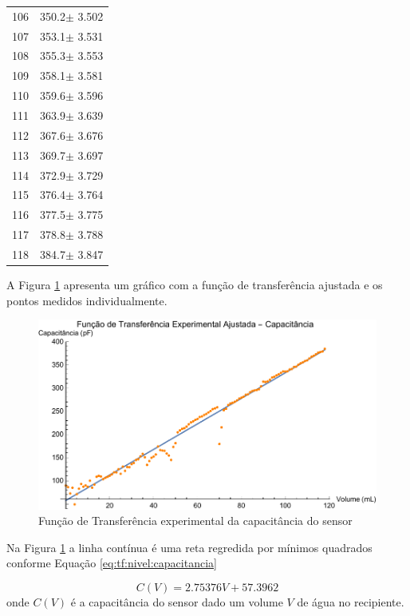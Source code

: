 \documentclass[a4paper]{instrumentacao}
\begin{document}
\begin{longtable}{cc}
 106 & 350.2$\pm$ 3.502 \\
 107 & 353.1$\pm$ 3.531 \\
 108 & 355.3$\pm$ 3.553 \\
 109 & 358.1$\pm$ 3.581 \\
 110 & 359.6$\pm$ 3.596 \\
 111 & 363.9$\pm$ 3.639 \\
 112 & 367.6$\pm$ 3.676 \\
 113 & 369.7$\pm$ 3.697 \\
 114 & 372.9$\pm$ 3.729 \\
 115 & 376.4$\pm$ 3.764 \\
 116 & 377.5$\pm$ 3.775 \\
 117 & 378.8$\pm$ 3.788 \\
 118 & 384.7$\pm$ 3.847 \\
\end{longtable}

A Figura \ref{fig:tf:nivel:capacitancia} apresenta um gráfico com a função de transferência ajustada e os pontos medidos individualmente.

\begin{figure}[H]
	\centering \includegraphics[width=\textwidth]{Nivel/Experimental/Capacitancia-Ajuste.pdf}
	\caption{Função de Transferência experimental da capacitância do sensor}
	\label{fig:tf:nivel:capacitancia}
\end{figure}

Na Figura \ref{fig:tf:nivel:capacitancia} a linha contínua é uma reta regredida por mínimos quadrados conforme Equação \ref{eq:tf:nivel:capacitancia}

\begin{equation}
	C(V) = 2.75376 V+57.3962
	\label{eq:tf:nivel:capacitancia}
\end{equation}
\noindent onde $C(V)$ é a capacitância do sensor dado um volume $V$ de água no recipiente.
\end{document}

